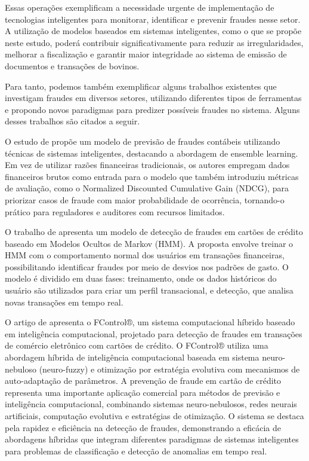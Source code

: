 Essas operações exemplificam a necessidade urgente de implementação de tecnologias inteligentes para monitorar, identificar e prevenir fraudes nesse setor. A utilização de modelos baseados em sistemas inteligentes, como o que se propõe neste estudo, poderá contribuir significativamente para reduzir as irregularidades, melhorar a fiscalização e garantir maior integridade ao sistema de emissão de documentos e transações de bovinos.

Para tanto, podemos também exemplificar alguns trabalhos existentes que investigam fraudes em diversos setores, utilizando diferentes tipos de ferramentas e propondo novos paradigmas para predizer possíveis fraudes no sistema. Alguns desses trabalhos são citados a seguir. 

O estudo de  propõe um modelo de previsão de fraudes contábeis utilizando técnicas de sistemas inteligentes, destacando a abordagem de ensemble learning. Em vez de utilizar razões financeiras tradicionais, os autores empregam dados financeiros brutos como entrada para o modelo que também introduziu métricas de avaliação, como o Normalized Discounted Cumulative Gain (NDCG), para priorizar casos de fraude com maior probabilidade de ocorrência, tornando-o prático para reguladores e auditores com recursos limitados. 

O trabalho de  apresenta um modelo de detecção de fraudes em cartões de crédito baseado em Modelos Ocultos de Markov (HMM). A proposta envolve treinar o HMM com o comportamento normal dos usuários em transações financeiras, possibilitando identificar fraudes por meio de desvios nos padrões de gasto. O modelo é dividido em duas fases: treinamento, onde os dados históricos do usuário são utilizados para criar um perfil transacional, e detecção, que analisa novas transações em tempo real. 

O artigo de  apresenta o FControl®, um sistema computacional híbrido baseado em inteligência computacional, projetado para detecção de fraudes em transações de comércio eletrônico com cartões de crédito. O FControl® utiliza uma abordagem híbrida de inteligência computacional baseada em sistema neuro-nebuloso (neuro-fuzzy) e otimização por estratégia evolutiva com mecanismos de auto-adaptação de parâmetros. A prevenção de fraude em cartão de crédito representa uma importante aplicação comercial para métodos de previsão e inteligência computacional, combinando sistemas neuro-nebulosos, redes neurais artificiais, computação evolutiva e estratégias de otimização. O sistema se destaca pela rapidez e eficiência na detecção de fraudes, demonstrando a eficácia de abordagens híbridas que integram diferentes paradigmas de sistemas inteligentes para problemas de classificação e detecção de anomalias em tempo real. 

